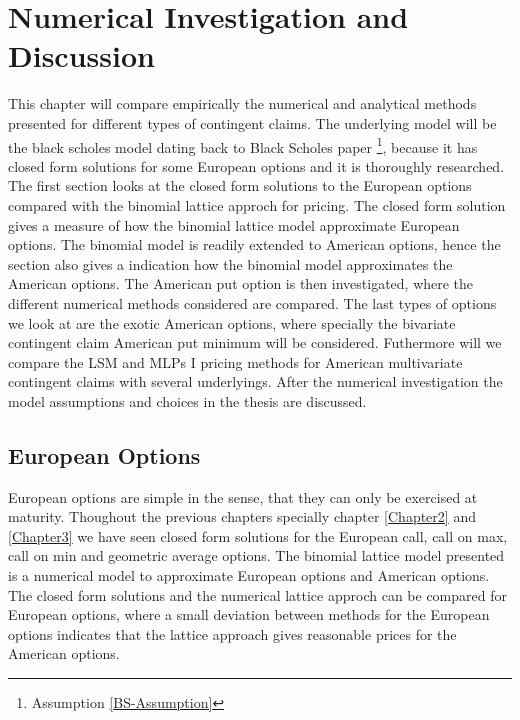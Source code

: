 
\chapter{Numerical Investigation and Discussion} %

\label{Chapter6} %

This chapter will compare empirically the numerical and analytical methods presented for different types of contingent claims. The underlying model will be the black scholes model dating back to Black Scholes paper \parencite{B-S-Paper}\footnote{Assumption \ref{BS-Assumption}}, because it has closed form solutions for some European options and it is thoroughly researched.\\

The first section looks at the closed form solutions to the European options compared with the binomial lattice approch for pricing. The closed form solution gives a measure of how the binomial lattice model approximate European options. The binomial model is readily extended to American options, hence the section also gives a indication how the binomial model approximates the American options. The American put option is then investigated, where the different numerical methods considered are compared. The last types of options we look at are the exotic American options, where specially the bivariate contingent claim American put minimum will be considered. Futhermore will we compare the LSM and MLPs I pricing methods for American multivariate contingent claims with several underlyings. After the numerical investigation the model assumptions and choices in the thesis are discussed.


\section{European Options}
European options are simple in the sense, that they can only be exercised at maturity. Thoughout the previous chapters specially chapter \ref{Chapter2} and \ref{Chapter3} we have seen closed form solutions for the European call, call on max, call on min and geometric average options. The binomial lattice model presented is a numerical model to approximate European options and American options. The closed form solutions and the numerical lattice approch can be compared for European options, where a small deviation between methods for the European options indicates that the lattice approach gives reasonable prices for the American options.\\

